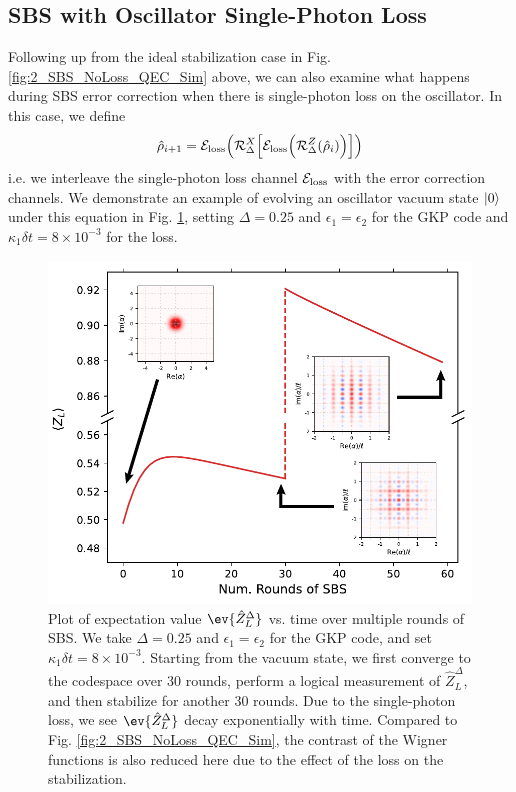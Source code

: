 \subsection{SBS with Oscillator Single-Photon Loss}
Following up from the ideal stabilization case in Fig. \ref{fig:2_SBS_NoLoss_QEC_Sim} above, we can also examine what happens during SBS error correction when there is single-photon loss on the oscillator. In this case, we define \begin{equation}
    \hat{\rho}_{i + 1} =  \mathcal{E}_{\rm loss}\Big(\mathcal{R}_\Delta^X\Big[\mathcal{E}_{\rm loss}\Big(\mathcal{R}_\Delta^Z(\hat{\rho}_i)\Big)\Big]\Big)
    \label{eq:2_SBS_Lossy_Kraus}
\end{equation}
i.e. we interleave the single-photon loss channel $\mathcal{E}_{\rm loss}$ with the error correction channels. We demonstrate an example of evolving an oscillator vacuum state $\lvert0\rangle$ under this equation in Fig. \ref{fig:2_SBS_Lossy_QEC_Sim}, setting $\Delta = 0.25$ and $\epsilon_1 = \epsilon_2$ for the GKP code and $\kappa_1\delta t = 8\times 10^{-3}$ for the loss.
\begin{figure}[h]
    \centering
    \includegraphics[width=0.85\linewidth]{Figures/2/SBS_Lossy_QEC_Sim.pdf}
    \caption{Plot of expectation value $\ev{\hat{Z}_L^\Delta}$ vs. time over multiple rounds of SBS. We take $\Delta = 0.25$ and $\epsilon_1 = \epsilon_2$ for the GKP code, and set $\kappa_1\delta t = 8\times 10^{-3}$. Starting from the vacuum state, we first converge to the codespace over 30 rounds, perform a logical measurement of $\hat{Z}_L^\Delta$, and then stabilize for another 30 rounds. Due to the single-photon loss, we see $\ev{\hat{Z}_L^\Delta}$ decay exponentially with time. Compared to Fig. \ref{fig:2_SBS_NoLoss_QEC_Sim}, the contrast of the Wigner functions is also reduced here due to the effect of the loss on the stabilization.}
    \label{fig:2_SBS_Lossy_QEC_Sim}
\end{figure}

